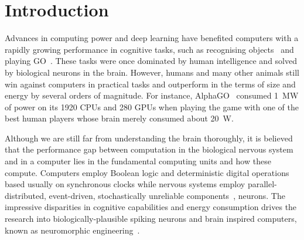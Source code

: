 \documentclass{article}
\begin{document}
\begin{abstract}
	\end{abstract}
	
	\section{Introduction}
	Advances in computing power and deep learning have benefited computers with a rapidly growing performance in cognitive tasks, such as recognising objects~\cite{deng2009imagenet} and playing GO~\cite{silver2016mastering}. 
	These tasks were once dominated by human intelligence and solved by biological neurons in the brain.
	However, humans and many other animals still win against computers in practical tasks and outperform in the terms of size and energy by several orders of magnitude.
	For instance, AlphaGO~\cite{silver2016mastering} consumed 1~MW of power on its 1920 CPUs and 280 GPUs when playing the game with one of the best human players whose brain merely consumed about 20~W.

	Although we are still far from understanding the brain thoroughly, it is believed that the performance gap between computation in the biological nervous system and in a computer lies in the fundamental computing units and how these compute.
	Computers employ Boolean logic and deterministic digital operations based usually on synchronous clocks while nervous systems employ parallel-distributed, event-driven, stochastically unreliable components~\cite{indiveri2009artificial}, neurons.
	The impressive disparities in cognitive capabilities and energy consumption drives the research into biologically-plausible spiking neurons and brain inspired computers, known as neuromorphic engineering~\cite{furber2016bio}.
	
\end{document}
